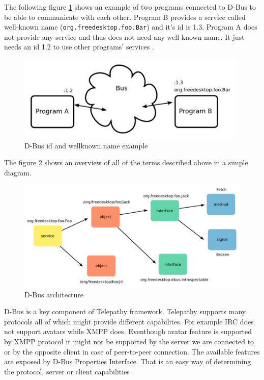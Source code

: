 The following figure \ref{fig:dbusArchitectureNames} shows an example of two programs connected to D-Bus to be able to communicate with each other. Program B provides a service called well-known name (\verb|org.freedesktop.foo.Bar|) and it's id is 1.3. Program A does not provide any service and thus does not need any well-known name. It just needs an id 1.2 to use other programs' services \cite{TPWiki}.

\begin{figure}[ht]
\begin{center}
	\includegraphics[width=11cm]{fig/dbus-architecture-names.png}
	\caption{D-Bus id and wellknown name example \cite{TPWiki}}
	\label{fig:dbusArchitectureNames}
\end{center}
\end{figure}


The figure \ref{fig:dbusArchitecture} shows an overview of all of the terms described above in a simple diagram.

\begin{figure}[ht]
\begin{center}
	\includegraphics[width=15cm]{fig/dbus-architecture-overview.png}
	\caption{D-Bus architecture \cite{TPWiki}}
	\label{fig:dbusArchitecture}
\end{center}
\end{figure}

D-Bus is a key component of Telepathy framework. Telepathy supports many protocols all of which might provide different capabilites. For example IRC does not support avatars while XMPP does. Eventhough avatar feature is supported by XMPP protocol it might not be supported by the server we are connected to or by the opposite client in case of peer-to-peer connection. The available features are exposed by D-Bus Properties Interface. That is an easy way of determining the protocol, server or client capabilities \cite{dbus}.

